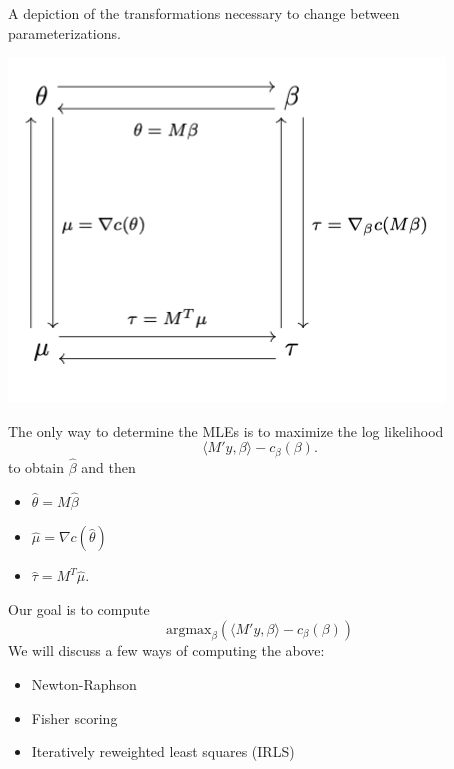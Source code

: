 \documentclass[
  ignorenonframetext,
]{beamer}
\providecommand{\tightlist}{%
  \setlength{\itemsep}{0pt}\setlength{\parskip}{0pt}}
\begin{document}
\begin{frame}{}
\protect\hypertarget{section}{}
A depiction of the transformations necessary to change between
parameterizations.

\includegraphics{transformations.png}
\end{frame}

\begin{frame}{}
\protect\hypertarget{section-1}{}
The only way to determine the MLEs is to maximize the log likelihood \[
  \langle M'y, \beta \rangle - c_\beta(\beta).
\] to obtain \(\hat\beta\) and then

\begin{itemize}
\tightlist
\item
  \(\hat\theta = M\hat\beta\)
\item
  \(\hat\mu = \nabla c(\hat\theta)\)
\item
  \(\hat\tau = M^T\hat\mu\).
\end{itemize}
\end{frame}

\begin{frame}{}
\protect\hypertarget{section-2}{}
Our goal is to compute \[
  \text{argmax}_\beta \left( \langle M'y, \beta \rangle - c_\beta(\beta)  \right)
\] We will discuss a few ways of computing the above:

\begin{itemize}
\tightlist
\item
  Newton-Raphson
\item
  Fisher scoring
\item
  Iteratively reweighted least squares (IRLS)
\end{itemize}
\end{frame}
\end{document}
